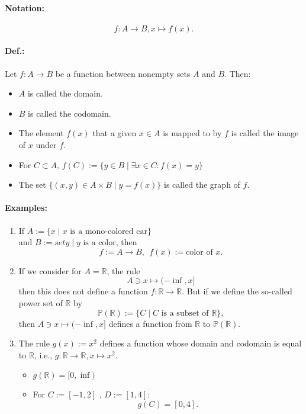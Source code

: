 \documentclass[twocolumn]{article}
\begin{document}
		\paragraph{Notation:}
			\[
			f:A\to B,x\mapsto f(x)
			.\] 
		
		\paragraph{Def.:}
			Let $f:A\to B$ be a function between nonempty sets $A$ and $B$. Then:
			\begin{itemize}%
			\renewcommand{\labelitemi}{$\rightarrow$}
			\item $A$ is called the domain.
			\item $B$ is called the codomain.
			\item The element $f(x)$ that a given $x\in A$ is mapped to by $f$ 
				is called the image of $x$ under $f$.
			\item For $C\subset A$, $f(C):=\{y\in B\mid \exists x\in C:f(x)=y\}$ 
			\item The set $\{(x,y)\in A\times B\mid y=f(x)\}$ is called the graph
				of $f$. 
			\end{itemize}
		\paragraph{Examples:}
			\begin{enumerate}
			\item If $A:=\{x\mid x\mbox{ is a mono-colored car}\}$ \\
				and $B:=set y\mid y\mbox{ is a color}$, then 
				\[
				f:=A\to B,~~f(x):=\mbox{color of }x
				.\] 
			\item If we consider for $A=\mathbb R$, the rule
				\[
					A\ni x\mapsto(-\inf,x]
				\]
				then this does not define a function 
				$f:\mathbb R\to\mathbb R $. But if we define the so-called
				power set of $\mathbb R $ by
				\[
				\mathbb P(\mathbb R ):=\{C\mid C\mbox{ is a subset of }
				\mathbb R \}
				,\]
				then $A\ni x\mapsto(-\inf,x]$ defines a function from 
				$\mathbb R $ to $\mathbb P(\mathbb R)$.
			\item The rule $g(x):=x^2$ defines a function whose domain and codomain
				is equal to $\mathbb R $, i.e., $g:\mathbb R\to\mathbb R,x
				\mapsto x^2$.
				\begin{itemize}%
				\renewcommand{\labelitemi}{$\rightarrow$}
				\item $g(\mathbb R )=[0,\inf)$ 
				\item For $C:=[-1,2]$ , $D:=[1,4]$:
					\[
						g(C)=[0,4]
					.\] 
				\end{itemize}
			\end{enumerate}
	
\end{document}
